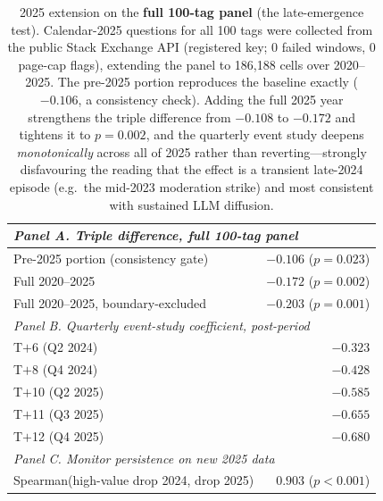 \begin{table}[ht]
\centering
\caption{2025 extension on the \textbf{full 100-tag panel} (the
late-emergence test). Calendar-2025 questions for all 100 tags were
collected from the public Stack Exchange API (registered key; 0 failed
windows, 0 page-cap flags), extending the panel to 186{,}188 cells over
2020--2025. The pre-2025 portion reproduces the baseline exactly
($-0.106$, a consistency check). Adding the full 2025 year strengthens
the triple difference from $-0.108$ to $-0.172$ and tightens it to
$p=0.002$, and the quarterly event study deepens \emph{monotonically}
across all of 2025 rather than reverting---strongly disfavouring the
reading that the effect is a transient late-2024 episode (e.g.\ the
mid-2023 moderation strike) and most consistent with sustained LLM
diffusion.}
\label{tab:extension_2025}
\small
\begin{tabular}{lr}
\toprule
\multicolumn{2}{l}{\emph{Panel A. Triple difference, full 100-tag panel}} \\
\midrule
Pre-2025 portion (consistency gate)        & $-0.106$ ($p=0.023$) \\
Full 2020--2025                            & $-0.172$ ($p=0.002$) \\
Full 2020--2025, boundary-excluded         & $-0.203$ ($p=0.001$) \\
\midrule
\multicolumn{2}{l}{\emph{Panel B. Quarterly event-study coefficient, post-period}} \\
\midrule
T$+$6 (Q2 2024)  & $-0.323$ \\
T$+$8 (Q4 2024)  & $-0.428$ \\
T$+$10 (Q2 2025) & $-0.585$ \\
T$+$11 (Q3 2025) & $-0.655$ \\
T$+$12 (Q4 2025) & $-0.680$ \\
\midrule
\multicolumn{2}{l}{\emph{Panel C. Monitor persistence on new 2025 data}} \\
\midrule
Spearman(high-value drop 2024, drop 2025) & $0.903$ ($p<0.001$) \\
\bottomrule
\end{tabular}
\end{table}

